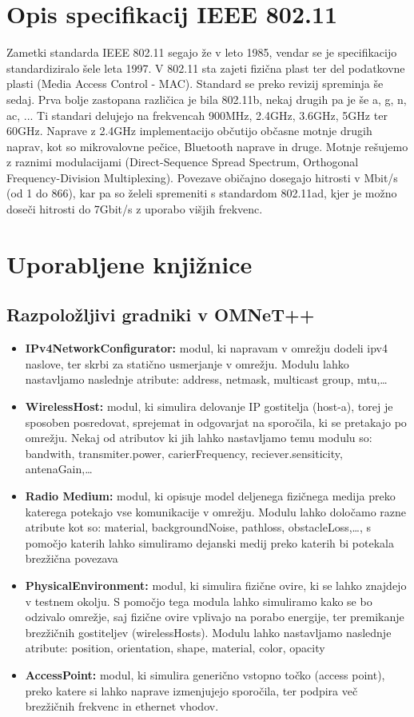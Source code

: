 \documentclass[11pt,a4paper,slovene]{myarticle}
\begin{document}
\section{Opis specifikacij IEEE 802.11}
Zametki standarda IEEE 802.11 segajo že v leto 1985, vendar se je specifikacijo standardiziralo šele leta 1997. V 802.11 sta zajeti fizična plast ter del podatkovne plasti (Media Access Control - MAC). Standard se preko revizij spreminja še sedaj. Prva bolje zastopana različica je bila 802.11b, nekaj drugih pa je še a, g, n, ac, ... Ti standari delujejo na frekvencah 900MHz, 2.4GHz, 3.6GHz, 5GHz ter 60GHz. Naprave z 2.4GHz implementacijo občutijo občasne motnje drugih naprav, kot so mikrovalovne pečice, Bluetooth naprave in druge. Motnje rešujemo z raznimi modulacijami (Direct-Sequence Spread Spectrum, Orthogonal Frequency-Division Multiplexing). Povezave običajno dosegajo hitrosti v Mbit/s (od 1 do 866), kar pa so želeli spremeniti s standardom 802.11ad, kjer je možno doseči hitrosti do 7Gbit/s z uporabo višjih frekvenc.

\section{Uporabljene knjižnice}
\subsection{Razpoložljivi gradniki v OMNeT++}
\begin{itemize}
	\item \textbf{IPv4NetworkConfigurator:} modul, ki napravam v omrežju dodeli ipv4 naslove, ter skrbi za statično usmerjanje v omrežju. Modulu lahko nastavljamo naslednje atribute: address, netmask, multicast group, mtu,…
	\item \textbf{WirelessHost:} modul, ki simulira delovanje IP gostitelja (host-a), torej je sposoben posredovat, sprejemat in odgovarjat na sporočila, ki se pretakajo po omrežju. Nekaj od atributov ki jih lahko nastavljamo temu modulu so: bandwith,  transmiter.power, carierFrequency, reciever.sensiticity, antenaGain,…
	\item \textbf{Radio Medium:} modul, ki opisuje model deljenega fizičnega medija preko katerega potekajo vse komunikacije v omrežju. Modulu lahko določamo razne atribute kot so: material, backgroundNoise, pathloss, obstacleLoss,…, s pomočjo katerih lahko simuliramo dejanski medij preko katerih bi potekala brezžična povezava
	\item \textbf{PhysicalEnvironment:} modul, ki simulira fizične ovire, ki se lahko znajdejo v testnem okolju. S pomočjo tega modula lahko simuliramo kako se bo odzivalo omrežje, saj fizične ovire vplivajo na porabo energije, ter premikanje brezžičnih gostiteljev (wirelessHosts). Modulu lahko nastavljamo naslednje atribute: position, orientation, shape, material, color, opacity
	\item \textbf{AccessPoint:} modul, ki simulira generično vstopno točko (access point), preko katere si lahko naprave izmenjujejo sporočila, ter podpira več brezžičnih frekvenc in ethernet vhodov.
\end{itemize}
\end{document}
